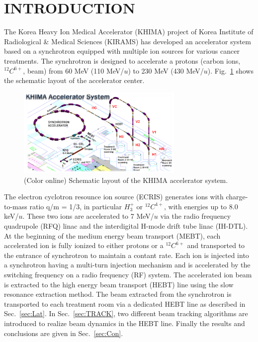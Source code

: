 \documentclass[jkps,preprint,fleqn,showpacs,showkeys]{revtex4}
\begin{document}

\section{INTRODUCTION}
The Korea Heavy Ion Medical Accelerator (KHIMA) project of Korea Institute of Radiological \& Medical Sciences (KIRAMS) 
has developed an accelerator system based on a synchrotron equipped with multiple ion sources for various cancer treatments.
The synchrotron is designed to accelerate a protons (carbon ions, $^{12}C^{6+}$, beam) 
from 60 MeV (110 MeV/$u$) to 230 MeV (430 MeV/$u$). %
Fig.~\ref{fig0} shows the schematic layout of the accelerator center. 
\begin{figure}[h]
  \begin{center}
    \includegraphics[width=8.0cm]{Fig01.png}
    \caption{(Color online) Schematic layout of the KHIMA accelerator system.}
    \label{fig0}
  \end{center}
\end{figure}
The electron cyclotron resounce ion source (ECRIS) generates ions with charge-to-mass ratio q/m = 1/3, in particular $H^{+}_{3}$ or $^{12}C^{4+}$, 
with energies up to 8.0 keV/$u$. 
These two ions are accelerated to 7 MeV/$u$ via the radio frequency quadrupole (RFQ) linac and the interdigital H-mode drift tube linac (IH-DTL). 
At the beginning of the medium energy beam transport (MEBT), each accelerated ion is fully ionized to either protons or a $^{12}C^{6+}$ 
and transported to the entrance of synchrotron to maintain a contant rate. 
Each ion is injected into a synchrotron having a multi-turn injection mechanism and is accelerated by the switching frequency on a radio frequency (RF) system. 
The accelerated ion beam is extracted to the high energy beam transport (HEBT) line using the slow resonance extraction method\cite{Extract,HJYim,Chawon}.
The beam extracted from the synchrotron is transported to each treatment room via a dedicated HEBT line as described in Sec.~\ref{sec:Lat}.
In Sec.~\ref{sec:TRACK}, two different beam tracking algorithms are introduced to realize beam dynamics in the HEBT line.
Finally the results and conclusions are given in Sec.~\ref{sec:Con}.
\end{document}
